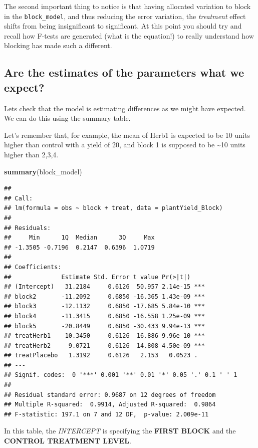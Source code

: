\documentclass[
]{book}
\newenvironment{Shaded}{\begin{snugshade}}{\end{snugshade}}
\newcommand{\FunctionTok}[1]{\textcolor[rgb]{0.13,0.29,0.53}{\textbf{#1}}}
\newcommand{\NormalTok}[1]{#1}
\begin{document}
The second important thing to notice is that having allocated variation to block in the \texttt{block\_model}, and thus reducing the error variation, the \emph{treatment} effect shifts from being insignificant to significant. At this point you should try and recall how F-tests are generated (what is the equation!) to really understand how blocking has made such a different.

\subsection{Are the estimates of the parameters what we expect?}\label{are-the-estimates-of-the-parameters-what-we-expect}

Lets check that the model is estimating differences as we might have expected. We can do this using the summary table.

Let's remember that, for example, the mean of Herb1 is expected to be 10 units higher than control with a yield of 20, and block 1 is supposed to be \textasciitilde10 units higher than 2,3,4.

\begin{Shaded}
\begin{Highlighting}[]
\FunctionTok{summary}\NormalTok{(block\_model)}
\end{Highlighting}
\end{Shaded}

\begin{verbatim}
## 
## Call:
## lm(formula = obs ~ block + treat, data = plantYield_Block)
## 
## Residuals:
##     Min      1Q  Median      3Q     Max 
## -1.3505 -0.7196  0.2147  0.6396  1.0719 
## 
## Coefficients:
##              Estimate Std. Error t value Pr(>|t|)    
## (Intercept)   31.2184     0.6126  50.957 2.14e-15 ***
## block2       -11.2092     0.6850 -16.365 1.43e-09 ***
## block3       -12.1132     0.6850 -17.685 5.84e-10 ***
## block4       -11.3415     0.6850 -16.558 1.25e-09 ***
## block5       -20.8449     0.6850 -30.433 9.94e-13 ***
## treatHerb1    10.3450     0.6126  16.886 9.96e-10 ***
## treatHerb2     9.0721     0.6126  14.808 4.50e-09 ***
## treatPlacebo   1.3192     0.6126   2.153   0.0523 .  
## ---
## Signif. codes:  0 '***' 0.001 '**' 0.01 '*' 0.05 '.' 0.1 ' ' 1
## 
## Residual standard error: 0.9687 on 12 degrees of freedom
## Multiple R-squared:  0.9914, Adjusted R-squared:  0.9864 
## F-statistic: 197.1 on 7 and 12 DF,  p-value: 2.009e-11
\end{verbatim}

In this table, the \emph{INTERCEPT} is specifying the \textbf{FIRST BLOCK} and the \textbf{CONTROL TREATMENT LEVEL}.
\end{document}
